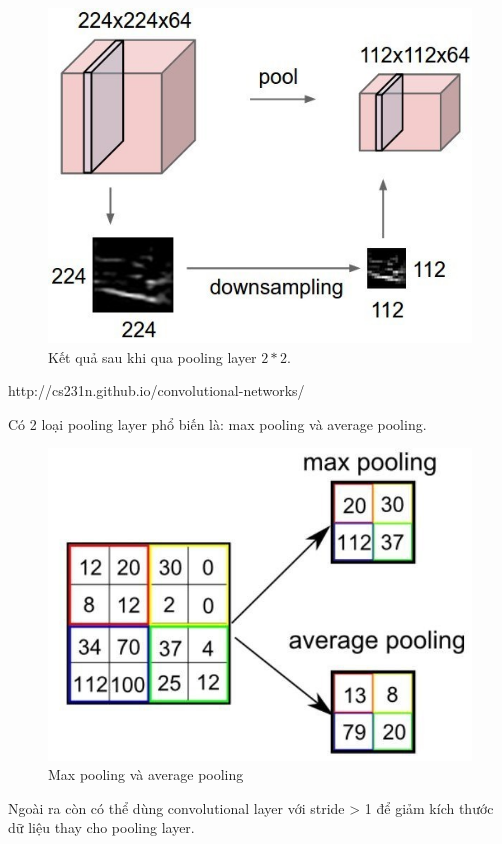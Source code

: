 \FloatBarrier
\begin{figure}[htp]
\begin{center}
\includegraphics[scale=0.5]{chap2/c2_figs/pooling.jpeg}
\end{center}
\caption{Kết quả sau khi qua pooling layer $2*2$.}
\label{fig:pooling}
\end{figure}
\FloatBarrier
\centerline{http://cs231n.github.io/convolutional-networks/}

Có 2 loại pooling layer phổ biến là: max pooling và average pooling.
\FloatBarrier
\begin{figure}[htp]
\begin{center}
\includegraphics[scale=0.5]{chap2/c2_figs/10.jpg}
\end{center}
\caption{Max pooling và average pooling}
\label{fig:pooling}
\end{figure}
\FloatBarrier
Ngoài ra còn có thể dùng convolutional layer với stride > 1 để giảm kích thước dữ liệu thay cho pooling layer.

